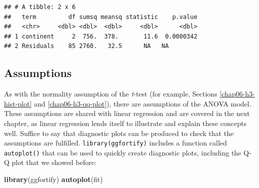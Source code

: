 \documentclass[
  12pt,
  krantz2]{krantz}
\makeatletter
\newenvironment{Shaded}{\begin{snugshade}}{\end{snugshade}}
\newcommand{\DataTypeTok}[1]{\textcolor[rgb]{0.13,0.29,0.53}{#1}}
\newcommand{\DecValTok}[1]{\textcolor[rgb]{0.00,0.00,0.81}{#1}}
\newcommand{\KeywordTok}[1]{\textcolor[rgb]{0.13,0.29,0.53}{\textbf{#1}}}
\newcommand{\NormalTok}[1]{#1}
\newcommand{\OperatorTok}[1]{\textcolor[rgb]{0.81,0.36,0.00}{\textbf{#1}}}
\newcommand{\StringTok}[1]{\textcolor[rgb]{0.31,0.60,0.02}{#1}}
\newenvironment{kframe}{%
\medskip{}
\setlength{\fboxsep}{.8em}
 \def\at@end@of@kframe{}%
 \ifinner\ifhmode%
  \def\at@end@of@kframe{\end{minipage}}%
  \begin{minipage}{\columnwidth}%
 \fi\fi%
 \def\FrameCommand##1{\hskip\@totalleftmargin \hskip-\fboxsep
 \colorbox{shadecolor}{##1}\hskip-\fboxsep
     \hskip-\linewidth \hskip-\@totalleftmargin \hskip\columnwidth}%
 \MakeFramed {\advance\hsize-\width
   \@totalleftmargin\z@ \linewidth\hsize
   \@setminipage}}%
 {\par\unskip\endMakeFramed%
 \at@end@of@kframe}
\renewenvironment{Shaded}{\begin{kframe}}{\end{kframe}}
\makeatother
\begin{document}
\begin{Shaded}
\end{Shaded}

\begin{verbatim}
## # A tibble: 2 x 6
##   term         df sumsq meansq statistic    p.value
##   <chr>     <dbl> <dbl>  <dbl>     <dbl>      <dbl>
## 1 continent     2  756.  378.       11.6  0.0000342
## 2 Residuals    85 2760.   32.5      NA   NA
\end{verbatim}

\hypertarget{assumptions}{%
\subsection{Assumptions}\label{assumptions}}

As with the normality assumption of the \emph{t}-test (for example, Sections \ref{chap06-h3-hist-plot} and \ref{chap06-h3-qq-plot}), there are assumptions of the ANOVA model.
These assumptions are shared with linear regression and are covered in the next chapter, as linear regression lends itself to illustrate and explain these concepts well.
Suffice to say that diagnostic plots can be produced to check that the assumptions are fulfilled.
\texttt{library(ggfortify)} includes a function called \texttt{autoplot()} that can be used to quickly create diagnostic plots, including the Q-Q plot that we showed before:

\begin{Shaded}
\begin{Highlighting}[]
\KeywordTok{library}\NormalTok{(ggfortify)}
\KeywordTok{autoplot}\NormalTok{(fit)}
\end{Highlighting}
\end{Shaded}
\end{document}
